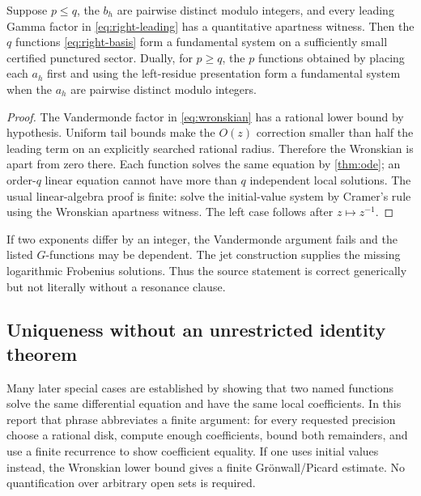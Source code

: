 \begin{theorem}\label{thm:fundamental}
Suppose $p\le q$, the $b_h$ are pairwise distinct modulo integers, and every
leading Gamma factor in \eqref{eq:right-leading} has a quantitative apartness
witness.  Then the $q$ functions \eqref{eq:right-basis} form a fundamental
system on a sufficiently small certified punctured sector.  Dually, for
$p\ge q$, the $p$ functions obtained by placing each $a_h$ first and using the
left-residue presentation form a fundamental system when the $a_h$ are
pairwise distinct modulo integers.
\end{theorem}
\begin{proof}
The Vandermonde factor in \eqref{eq:wronskian} has a rational lower bound by
hypothesis.  Uniform tail bounds make the $O(z)$ correction smaller than half
the leading term on an explicitly searched rational radius.  Therefore the
Wronskian is apart from zero there.  Each function solves the same equation by
\cref{thm:ode}; an order-$q$ linear equation cannot have more than $q$
independent local solutions.  The usual linear-algebra proof is finite: solve
the initial-value system by Cramer's rule using the Wronskian apartness witness.
The left case follows after $z\mapsto z^{-1}$.
\end{proof}

\begin{remark}[Resonance]
If two exponents differ by an integer, the Vandermonde argument fails and the
listed $G$-functions may be dependent.  The jet construction supplies the
missing logarithmic Frobenius solutions.  Thus the source statement is correct
generically but not literally without a resonance clause.
\end{remark}

\subsection{Uniqueness without an unrestricted identity theorem}

Many later special cases are established by showing that two named functions
solve the same differential equation and have the same local coefficients.  In
this report that phrase abbreviates a finite argument: for every requested
precision choose a rational disk, compute enough coefficients, bound both
remainders, and use a finite recurrence to show coefficient equality.  If one
uses initial values instead, the Wronskian lower bound gives a finite
Gr\"onwall/Picard estimate.  No quantification over arbitrary open sets is
required.
